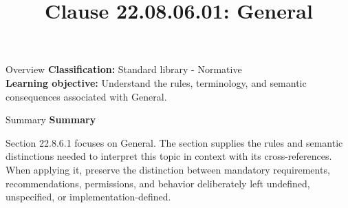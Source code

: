 \documentclass[10pt,letterpaper]{article}
\title{Clause 22.08.06.01: General}
\author{}
\date{}
\begin{document}
\maketitle
\begin{CornellOverviewBox}{Overview}
\textbf{Classification:} Standard library - Normative\\[2pt]
\textbf{Learning objective:} Understand the rules, terminology, and semantic consequences associated with General.
\end{CornellOverviewBox}\begin{CornellSummaryBox}{Summary}
{\sffamily\bfseries\color{Accent} Summary}\par\vspace{3pt}Section 22.8.6.1 focuses on General. The section supplies the rules and semantic distinctions needed to interpret this topic in context with its cross-references. When applying it, preserve the distinction between mandatory requirements, recommendations, permissions, and behavior deliberately left undefined, unspecified, or implementation-defined.
\end{CornellSummaryBox}
\end{document}
